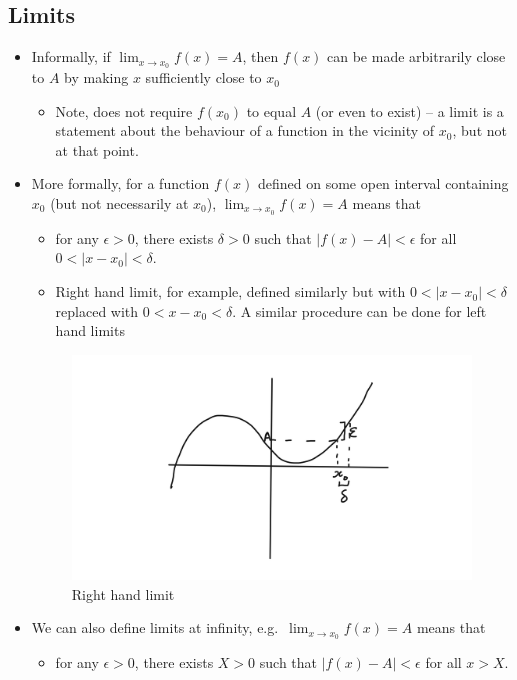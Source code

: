 \hypertarget{limits}{%
\subsection{Limits}\label{limits}}

\begin{itemize}
\item
  Informally, if \(\lim_{x \to x_0} f(x) = A\), then \(f(x)\) can be made arbitrarily close to \(A\) by making \(x\) sufficiently close to \(x_0\)

  \begin{itemize}
  \tightlist
  \item
    Note, does not require \(f(x_0)\) to equal \(A\) (or even to exist) -- a limit is a statement about the behaviour of a function in the vicinity of \(x_0\), but not at that point.
  \end{itemize}
\item
  More formally, for a function \(f(x)\) defined on some open interval containing \(x_0\) (but not necessarily at \(x_0\)), \(\lim_{x \to x_0} f(x) = A\) means that

  \begin{itemize}
  \tightlist
  \item
    for any \(\epsilon > 0\), there exists \(\delta >0\) such that \(|f(x) - A| < \epsilon\) for all \(0 < |x - x_0| < \delta\).
  \item
    Right hand limit, for example, defined similarly but with \(0 < |x - x_0| < \delta\) replaced with \(0 < x - x_0 < \delta\). A similar procedure can be done for left hand limits
  \end{itemize}

  \begin{figure}[h!]
    \centering 
    \includegraphics{figures/1}
    \caption{Right hand limit}
  \end{figure} \label{fig:1}
  
\item
  We can also define limits at infinity, e.g.~\(\lim_{x \to x_0} f(x) = A\) means that

  \begin{itemize}
  \tightlist
  \item
    for any \(\epsilon > 0\), there exists \(X >0\) such that \(|f(x) - A| < \epsilon\) for all \(x > X\).
  \end{itemize}
\end{itemize}

